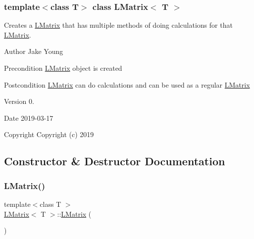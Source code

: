 \subsubsection*{template$<$class T$>$\newline
class L\+Matrix$<$ T $>$}

Creates a \mbox{\hyperlink{class_l_matrix}{L\+Matrix}} that has multiple methods of doing calculations for that \mbox{\hyperlink{class_l_matrix}{L\+Matrix}}. 

\begin{DoxyAuthor}{Author}
Jake Young 
\end{DoxyAuthor}
\begin{DoxyPrecond}{Precondition}
\mbox{\hyperlink{class_l_matrix}{L\+Matrix}} object is created 
\end{DoxyPrecond}
\begin{DoxyPostcond}{Postcondition}
\mbox{\hyperlink{class_l_matrix}{L\+Matrix}} can do calculations and can be used as a regular \mbox{\hyperlink{class_l_matrix}{L\+Matrix}} 
\end{DoxyPostcond}
\begin{DoxyVersion}{Version}
0. 
\end{DoxyVersion}
\begin{DoxyDate}{Date}
2019-\/03-\/17
\end{DoxyDate}
\begin{DoxyCopyright}{Copyright}
Copyright (c) 2019 
\end{DoxyCopyright}


\subsection{Constructor \& Destructor Documentation}
\mbox{\label{class_l_matrix_ae3c54a6ef307ad2e570db483b9fd9c03}} 
\subsubsection{\texorpdfstring{LMatrix()}{LMatrix()}\hspace{0.1cm}{\footnotesize\ttfamily [1/4]}}
{\footnotesize\ttfamily template$<$class T $>$ \\
\mbox{\hyperlink{class_l_matrix}{L\+Matrix}}$<$ T $>$\+::\mbox{\hyperlink{class_l_matrix}{L\+Matrix}} (\begin{DoxyParamCaption}{ }\end{DoxyParamCaption})}



